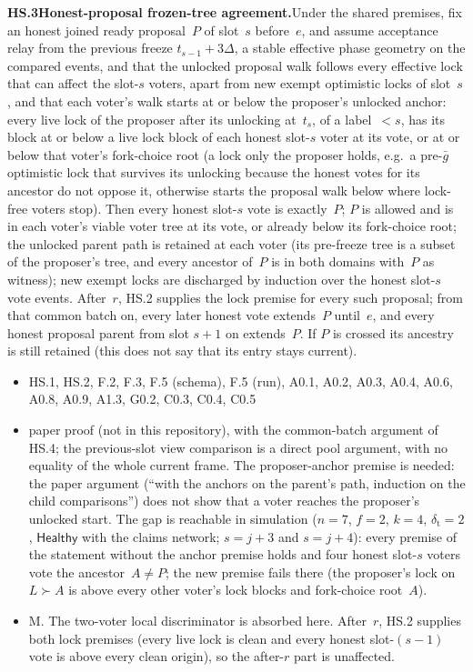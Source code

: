 \documentclass{article}
\newcommand{\dagnode}[6]{%
\par\medskip\noindent\textbf{#1\enspace #2.}\enspace #3
\begin{itemize}[leftmargin=2.2em,itemsep=0pt,topsep=2pt]
\item[\emph{Uses}] #4
\item[\emph{Evid.}] #5
\item[\emph{Task}] #6
\end{itemize}}
\begin{document}
\dagnode{HS.3}{Honest-proposal frozen-tree agreement}{Under the shared
premises, fix an honest joined ready proposal~$P$ of slot~$s$ before~$e$, and
assume acceptance relay from the previous freeze $t_{s-1}+3\Delta$, a stable
effective phase geometry on the compared events, and that the unlocked
proposal walk follows every effective lock that can affect the slot-$s$
voters, apart from new exempt optimistic locks of slot~$s$, and that each
voter's walk starts at or below the proposer's unlocked anchor: every live lock
of the proposer after its unlocking at~$t_s$, of a label~$<s$, has its block at
or below a live lock block of each honest slot-$s$ voter at its vote, or at or
below that voter's fork-choice root (a lock only the
proposer holds, e.g.\ a pre-$\bar g$ optimistic lock that survives its unlocking
because the honest votes for its ancestor do not oppose it, otherwise starts the
proposal walk below where lock-free voters stop).  Then every honest
slot-$s$ vote is exactly~$P$; $P$ is allowed and is in each voter's viable
voter tree at its vote, or already below its fork-choice root; the unlocked
parent path is retained at each voter (its pre-freeze tree is a subset of the
proposer's tree, and every ancestor of~$P$ is in both domains with~$P$ as
witness); new exempt locks are discharged by induction over the honest
slot-$s$ vote events.  After~$r$, HS.2 supplies the lock premise for every
such proposal; from that common batch on, every later honest vote extends~$P$
until~$e$, and every honest proposal parent from slot $s+1$ on extends~$P$.
If $P$ is crossed its ancestry is still retained (this does not say that its
entry stays current).}
{HS.1, HS.2, F.2, F.3, F.5 (schema), F.5 (run), A0.1, A0.2, A0.3, A0.4,
A0.6, A0.8, A0.9, A1.3, G0.2, C0.3, C0.4, C0.5}{paper proof (not in this repository), with the
common-batch argument of HS.4; the previous-slot view comparison is a direct
pool argument, with no equality of the whole current frame.  The
proposer-anchor premise is needed: the paper argument
(``with the anchors on the parent's path, induction on the child comparisons'')
does not show that a voter reaches the proposer's unlocked
start.
The gap is reachable in simulation ($n=7$, $f=2$, $k=4$, $\delta_{\mathrm t}=2$,
$\mathsf{Healthy}$ with the claims network; $s=j+3$ and $s=j+4$): every
premise of the statement without the anchor premise holds and four honest slot-$s$ voters vote the
ancestor~$A\neq P$; the new premise fails there (the proposer's lock on
$L\succ A$ is above every other voter's lock blocks and fork-choice root~$A$).}{M.  The
two-voter local discriminator is absorbed here.  After~$r$, HS.2 supplies both
lock premises (every live lock is clean and every honest slot-$(s-1)$ vote is
above every clean origin), so the after-$r$ part is unaffected.}
\end{document}

